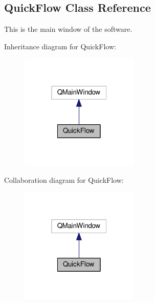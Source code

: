 \hypertarget{class_quick_flow}{}\subsection{Quick\+Flow Class Reference}
\label{class_quick_flow}


This is the main window of the software.  




Inheritance diagram for Quick\+Flow\+:
\nopagebreak
\begin{figure}[H]
\begin{center}
\leavevmode
\includegraphics[width=160pt]{class_quick_flow__inherit__graph}
\end{center}
\end{figure}


Collaboration diagram for Quick\+Flow\+:
\nopagebreak
\begin{figure}[H]
\begin{center}
\leavevmode
\includegraphics[width=160pt]{class_quick_flow__coll__graph}
\end{center}
\end{figure}
